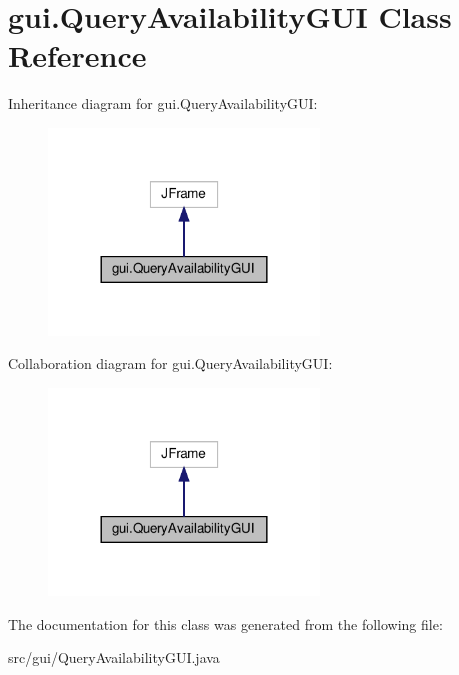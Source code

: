 \hypertarget{classgui_1_1_query_availability_g_u_i}{}\section{gui.\+Query\+Availability\+G\+UI Class Reference}
\label{classgui_1_1_query_availability_g_u_i}


Inheritance diagram for gui.\+Query\+Availability\+G\+UI\+:
\nopagebreak
\begin{figure}[H]
\begin{center}
\leavevmode
\includegraphics[width=204pt]{classgui_1_1_query_availability_g_u_i__inherit__graph}
\end{center}
\end{figure}


Collaboration diagram for gui.\+Query\+Availability\+G\+UI\+:
\nopagebreak
\begin{figure}[H]
\begin{center}
\leavevmode
\includegraphics[width=204pt]{classgui_1_1_query_availability_g_u_i__coll__graph}
\end{center}
\end{figure}


The documentation for this class was generated from the following file\+:\begin{DoxyCompactItemize}
\item 
src/gui/Query\+Availability\+G\+U\+I.\+java\end{DoxyCompactItemize}
